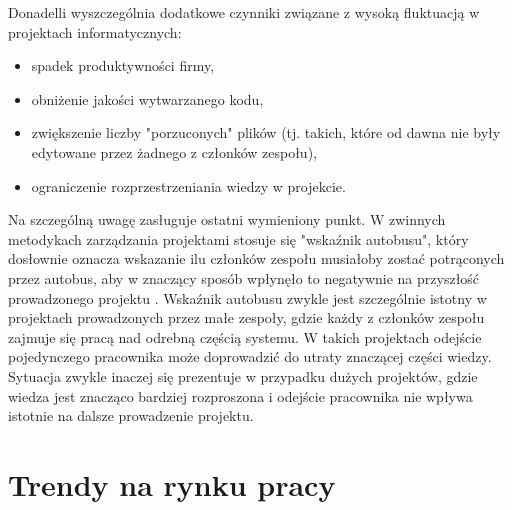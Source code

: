 Donadelli \cite{donadelli-2015} wyszczególnia dodatkowe czynniki związane z wysoką fluktuacją w projektach informatycznych:
\begin{itemize}
    \item spadek produktywności firmy,
    \item obniżenie jakości wytwarzanego kodu,
    \item zwiększenie liczby "porzuconych" plików (tj. takich, które od dawna nie były edytowane przez żadnego z członków zespołu),
    \item ograniczenie rozprzestrzeniania wiedzy w projekcie.
\end{itemize}

Na szczególną uwagę zasługuje ostatni wymieniony punkt.
W zwinnych metodykach zarządzania projektami stosuje się "wskaźnik autobusu", który dosłownie oznacza wskazanie ilu członków zespołu musiałoby zostać potrąconych przez autobus, aby w znaczący sposób wpłynęło to negatywnie na przyszłość prowadzonego projektu \cite{https://www.agileadvice.com/2005/05/15/agilemanagement/truck-factor/}.
Wskaźnik autobusu zwykle jest szczególnie istotny w projektach prowadzonych przez małe zespoły, gdzie każdy z członków zespołu zajmuje się pracą nad odrebną częścią systemu.
W takich projektach odejście pojedynczego pracownika może doprowadzić do utraty znaczącej części wiedzy.
Sytuacja zwykle inaczej się prezentuje w przypadku dużych projektów, gdzie wiedza jest znacząco bardziej rozproszona i odejście pracownika nie wpływa istotnie na dalsze prowadzenie projektu.

%
%


%
%


\section{Trendy na rynku pracy}

